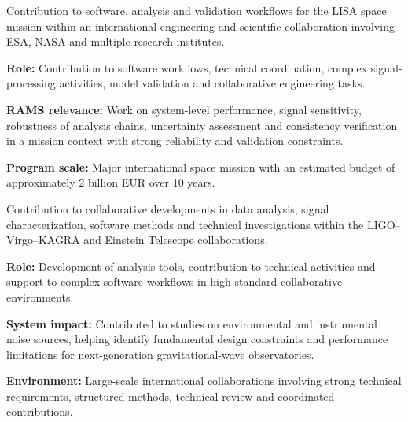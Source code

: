 \documentclass[8pt,a4paper,ragged2e,withhyper]{altacv}
\begin{document}
\newpage



Contribution to software, analysis and validation workflows for the LISA space mission within an international engineering and scientific collaboration involving ESA, NASA and multiple research institutes.

\textbf{Role:} Contribution to software workflows, technical coordination, complex signal-processing activities, model validation and collaborative engineering tasks.

\textbf{RAMS relevance:} Work on system-level performance, signal sensitivity, robustness of analysis chains, uncertainty assessment and consistency verification in a mission context with strong reliability and validation constraints.

\textbf{Program scale:} Major international space mission with an estimated budget of approximately 2 billion EUR over 10 years.

\divider


Contribution to collaborative developments in data analysis, signal characterization, software methods and technical investigations within the LIGO--Virgo--KAGRA and Einstein Telescope collaborations.

\textbf{Role:} Development of analysis tools, contribution to technical activities and support to complex software workflows in high-standard collaborative environments.

\textbf{System impact:} Contributed to studies on environmental and instrumental noise sources, helping identify fundamental design constraints and performance limitations for next-generation gravitational-wave observatories.

\textbf{Environment:} Large-scale international collaborations involving strong technical requirements, structured methods, technical review and coordinated contributions.


\vspace{-.3cm}

\end{document}

